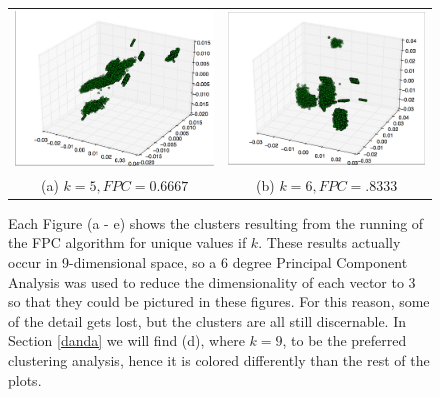 \documentclass[letterpaper, 12pt]{article}
\begin{document}
\begin{figure}[H]
\centering
\caption{\label{clusterfig} Each Figure (a - e) shows the clusters resulting from the running of the FPC algorithm for unique values if $k$. These results actually occur in 9-dimensional space, so a 6 degree Principal Component Analysis was used to reduce the dimensionality of each vector to 3 so that they could be pictured in these figures. For this reason, some of the detail gets lost, but the clusters are all still discernable. In Section \ref{danda} we will find (d), where $k = 9$, to be the preferred clustering analysis, hence it is colored differently than the rest of the plots.}
\begin{tabular}{cc}
  \includegraphics[width=65mm]{k5} &   \includegraphics[width=65mm]{k6} \\
(a) $k = 5, FPC = 0.6667$ & (b) $k = 6, FPC = .8333$ \\[6pt]
\end{tabular}
\end{figure}
\end{document}
